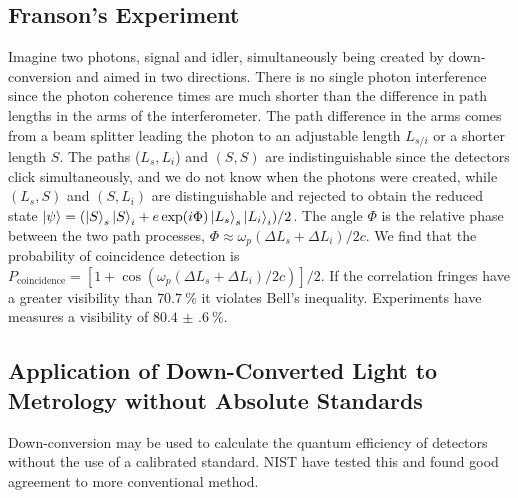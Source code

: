 \subsection{Franson's Experiment}
Imagine two photons, signal and idler, simultaneously being created by down-conversion and aimed in two directions. There is no single photon interference since the photon coherence times are much shorter than the difference in path lengths in the arms of the interferometer. The path difference in the arms comes from a beam splitter leading the photon to an adjustable length $L_{s/i}$ or a shorter length $S$. The paths ($L_s,L_i$) and $(S,S)$ are indistinguishable since the detectors click simultaneously, and we do not know when the photons were created, while $(L_s,S)$ and $(S,L_i)$ are distinguishable and rejected to obtain the reduced state $\ket{\psi} = (\ket{S}_s\ket{S}_i + e\exp(i\Phi)\ket{L_s}_s\ket{L_i}_i)/2$. The angle $\Phi$ is the relative phase between the two path processes, $\Phi \approx \omega_p (\Delta L_s +\Delta L_i)/2c$. We find that the probability of coincidence detection is $P_\text{coincidence} = [1 + \cos(\omega_p (\Delta L_s +\Delta L_i)/2c)]/2$. If the correlation fringes have a greater visibility than $\qty{70.7}{\percent}$ it violates Bell's inequality. Experiments have measures a visibility of $\qty{80.4(6)}{\percent}$. 

\subsection{Application of Down-Converted Light to Metrology without Absolute Standards}
Down-conversion may be used to calculate the quantum efficiency of detectors without the use of a calibrated standard. NIST have tested this and found good agreement to more conventional method. 